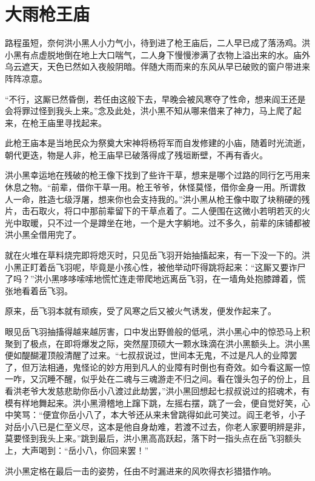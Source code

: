 \chapter{大雨枪王庙}
\label{chap:da-yu-qiang-wang-miao}


路程虽短，奈何洪小黑人小力气小，待到进了枪王庙后，二人早已成了落汤鸡。洪小黑有点虚脱地倒在地上大口喘气，二人身下慢慢渗满了衣物上溢出来的水。庙外乌云遮天，天色已然如入夜般阴暗。伴随大雨而来的东风从早已破败的窗户带进来阵阵凉意。

“不行，这厮已然昏倒，若任由这般下去，早晚会被风寒夺了性命，想来阎王还是会将罪过怪到我头上来。”念及此处，洪小黑不知从哪来借来了神力，马上爬了起来，在枪王庙里寻找起来。

此枪王庙本是当地民众为祭奠大宋神将杨将军而自发修建的小庙，随着时光流逝，朝代更迭，物是人非，枪王庙早已破落得成了残垣断壁，不再有香火。

洪小黑幸运地在残破的枪王像下找到了些许干草，想来是哪个过路的同行乞丐用来休息之物。“前辈，借你干草一用。枪王爷爷，休怪莫怪，借你金身一用。所谓救人一命，胜造七级浮屠，想来你也会支持我的。”洪小黑从枪王像中取了块稍硬的残片，击石取火，将口中那前辈留下的干草点着了。二人便围在这微小若明若灭的火光中取暖，只不过一个是蹲坐在地，一个是大字躺地。过不多久，前辈的床铺都被洪小黑全借用完了。

就在火堆在草料烧完即将熄灭时，只见岳飞羽开始抽搐起来，有一下没一下的。洪小黑正盯着岳飞羽呢，毕竟是小孩心性，被他举动吓得跳将起来：“这厮又要诈尸了吗？”洪小黑哆哆嗦嗦地慌忙连走带爬地远离岳飞羽，在一墙角处抱膝蹲着，慌张地看着岳飞羽。

原来，岳飞羽本就有顽疾，受了风寒之后又被火气诱发，便发作起来了。

眼见岳飞羽抽搐得越来越厉害，口中发出野兽般的低吼，洪小黑心中的惊恐马上积聚到了极点，在即将爆发之际，突然屋顶硕大一颗水珠滴在洪小黑额头上。洪小黑便如醍醐灌顶般清醒了过来。“七叔叔说过，世间本无鬼，不过是凡人的业障罢了，但万法相通，鬼怪论的妙方用到凡人的业障有时倒也有奇效。如今看这厮一惊一咋，又沉睡不醒，似乎处在二魂与三魂游走不归之间。看在馒头包子的份上，且看洪老爷大发慈悲助你岳小八渡过此劫罢，”洪小黑回想起七叔叔说过的招魂术，有模有样地舞起来。洪小黑滑稽地上蹿下跳，左摇右摆，跳了一会，便自觉好笑，心中笑骂：“便宜你岳小八了，本大爷还从来未曾跳得如此可笑过。阎王老爷，小子对岳小八已是仁至义尽，这本是他自身劫难，若渡不过去，你老人家要明辨是非，莫要怪到我头上来。”跳到最后，洪小黑高高跃起，落下时一指头点在岳飞羽额头上，大声喝到：“岳小八，你回来罢！”

洪小黑定格在最后一击的姿势，任由不时漏进来的风吹得衣衫猎猎作响。

